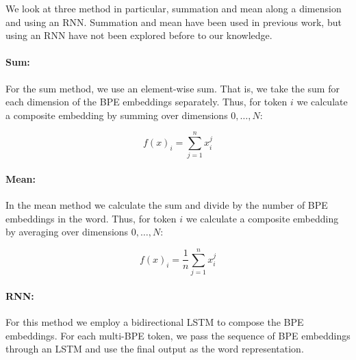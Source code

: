 \documentclass[11pt]{article}
\newcommand\jp[1]{(\textbf{JP:} #1)}
\begin{document}
	


        We look at three method in particular, summation and mean
     along a dimension and using an RNN. Summation and mean have been
     used in previous work, but using an RNN have not been explored
     before to our knowledge.
    
    	\paragraph{Sum:} For the sum method, we use an element-wise
     sum. That is, we take the sum for each dimension of the BPE
     embeddings separately. Thus, for token $i$ we calculate a
     composite embedding by summing over dimensions $0,\ldots,N$:
	
	\begin{equation}
	f(x)_i = \sum_{j=1}^{n} x_i^j
	\end{equation}
	

    	\paragraph{Mean:} In the mean method we calculate the sum and
     divide by the number of BPE embeddings in the word. Thus, for
     token $i$ we calculate a composite embedding by averaging over
     dimensions $0,\ldots,N$:
	
	\begin{equation}
	f(x)_{i} = \frac{1}{n}\sum_{j=1}^{n} x_i^j
	\end{equation}
	
	
	\paragraph{RNN:} For this method we employ a bidirectional LSTM
        to compose the BPE embeddings. For each multi-BPE
        token, we pass the sequence of BPE embeddings through an LSTM
        and use the final output as the word representation. 
    
\end{document}
